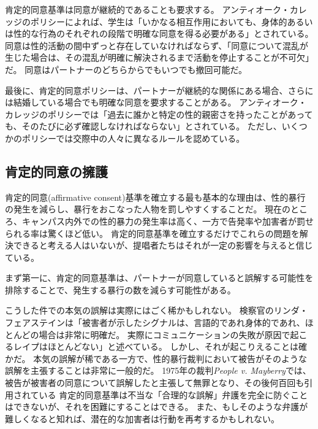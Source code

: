 \documentclass[paper=a4,book,openany]{jlreq} \usepackage{mystyle}
\begin{document}
肯定的同意基準は同意が継続的であることも要求する。
アンティオーク・カレッジのポリシーによれば、学生は「いかなる相互作用においても、身体的あるいは性的な行為のそれぞれの段階で明確な同意を得る必要がある」とされている。
同意は性的活動の間中ずっと存在していなければならず、「同意について混乱が生じた場合は、その混乱が明確に解決されるまで活動を停止することが不可欠」だ。
同意はパートナーのどちらからでもいつでも撤回可能だ。

最後に、肯定的同意ポリシーは、パートナーが継続的な関係にある場合、さらには結婚している場合でも明確な同意を要求することがある。
アンティオーク・カレッジのポリシーでは「過去に誰かと特定の性的親密さを持ったことがあっても、そのたびに必ず確認しなければならない」とされている。
ただし、いくつかのポリシーでは交際中の人々に異なるルールを認めている。

\subsection{肯定的同意の擁護}

肯定的同意(affirmative consent)基準を確立する最も基本的な理由は、性的暴行の発生を減らし、暴行をおこなった人物を罰しやすくすることだ。
現在のところ、キャンパス内外での性的暴力の発生率は高く、一方で告発率や加害者が罰せられる率は驚くほど低い。
肯定的同意基準を確立するだけでこれらの問題を解決できると考える人はいないが、提唱者たちはそれが一定の影響を与えると信じている。

まず第一に、肯定的同意基準は、パートナーが同意していると誤解する可能性を排除することで、発生する暴行の数を減らす可能性がある。

こうした件での本気の誤解は実際にはごく稀かもしれない。
検察官のリンダ・フェアステインは「被害者が示したシグナルは、言語的であれ身体的であれ、ほとんどの場合は非常に明確だ。
実際にコミュニケーションの失敗が原因で起こるレイプはほとんどない」と述べている\citep{fairstein94:_panel_discus_men_women_rape}。
しかし、それが起こりえることは確かだ。
本気の誤解が稀である一方で、性的暴行裁判において被告がそのような誤解を主張することは非常に一般的だ。
1975年の裁判\emph{People v. Mayberry}では、被告が被害者の同意について誤解したと主張して無罪となり、その後何百回も引用されている
肯定的同意基準は不当な「合理的な誤解」弁護を完全に防ぐことはできないが、それを困難にすることはできる。
また、もしそのような弁護が難しくなると知れば、潜在的な加害者は行動を再考するかもしれない。
\end{document}
